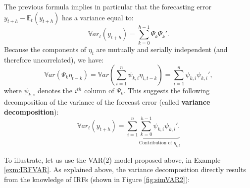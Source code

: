 \documentclass[
  12pt,
]{book}
\theoremstyle{definition}
\theoremstyle{definition}
\theoremstyle{definition}
\theoremstyle{definition}
\theoremstyle{remark}
\begin{document}
The previous formula implies in particular that the forecasting error \(y_{t+h} - \mathbb{E}_t(y_{t+h})\) has a variance equal to:
\[
\boxed{\mathbb{V}ar_t(y_{t+h}) = \sum_{k=0}^{h-1} \Psi_{k}\Psi_{k}'.}
\]
Because the components of \(\eta_t\) are mutually and serially independent (and therefore uncorrelated), we have:
\[
\mathbb{V}ar(\Psi_k \eta_{t-k}) = \mathbb{V}ar\left(\sum_{i=1}^n \psi_{k,i} \eta_{i,t-k}\right)  = \sum_{i=1}^n \psi_{k,i}\psi_{k,i}',
\]
where \(\psi_{k,i}\) denotes the \(i^{th}\) column of \(\Psi_k\). This suggests the following decomposition of the variance of the forecast error (called \textbf{variance decomposition}):
\[
\mathbb{V}ar_t(y_{t+h}) = \sum_{i=1}^n \underbrace{\sum_{k=0}^{h-1}\psi_{k,i}\psi_{k,i}'.}_{\mbox{Contribution of $\eta_{i,t}$}}
\]

To illustrate, let us use the VAR(2) model proposed above, in Example \ref{exm:IRFVAR}. As explained above, the variance decomposition directly results from the knowledge of IRFs (shown in Figure \ref{fig:simVAR2}):
\end{document}
